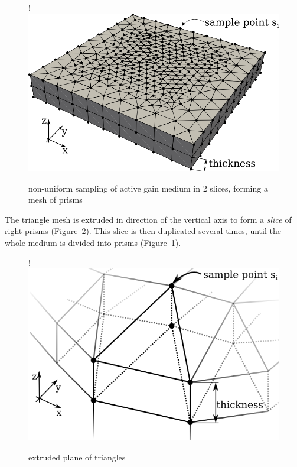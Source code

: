 \begin{figure}[H]
  \centerline{
     {!} {\includegraphics{graphics/samples_reduced.png}}
  }
  \caption{non-uniform sampling of active gain medium in 2 slices, forming a
  mesh of prisms}
  \label{graphic:samples_reduced}
\end{figure}
The triangle mesh is extruded in direction of the vertical axis to form a
\emph{slice} of right prisms (Figure~\ref{graphic:extruded_mesh}). This
slice is then duplicated several times, until the whole medium is divided into
prisms (Figure~\ref{graphic:samples_reduced}).

\begin{figure}[H]
  \centerline{
     {!} {\includegraphics{graphics/delauny_4.png}}
  }
  \caption{extruded plane of triangles}
  \label{graphic:extruded_mesh}
\end{figure}

